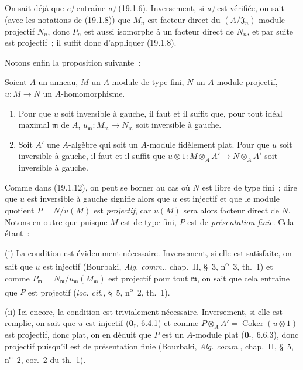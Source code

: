 On sait déjà que \emph{c)} entraîne \emph{a)} (19.1.6). Inversement, si \emph{a)} est vérifiée, on
sait (avec les notations de (19.1.8)) que $M_n$ est facteur direct du
$(A/\mathfrak J_n)$-module projectif $N_n$, donc $P_n$ est aussi isomorphe à
un facteur direct de $N_n$, et par suite est projectif~; il suffit donc
d'appliquer (19.1.8).

Notons enfin la proposition suivante~:

\begin{proposition}[19.1.14]
\label{0.19.1.14-fr}
Soient $A$ un anneau, $M$ un $A$-module de type fini, $N$ un $A$-module
projectif, $u:M\to N$ un $A$-homomorphisme.
\begin{enumerate}
  \item[\textup{(i)}] Pour que $u$ soit inversible à gauche, il faut et il suffit que,
  pour tout idéal maximal $\mathfrak m$ de $A$,
  $u_{\mathfrak m}:M_{\mathfrak m}\to N_{\mathfrak m}$ soit inversible à
  gauche.
  \item[\textup{(ii)}] Soit $A'$ une $A$-algèbre qui soit un $A$-module fidèlement
  plat. Pour que $u$ soit inversible à gauche, il faut et il suffit que
  $u\otimes1:M\otimes_AA'\to N\otimes_AA'$ soit inversible à gauche.
\end{enumerate}
\end{proposition}

Comme dans (19.1.12), on peut se borner au cas où $N$ est libre de type fini~;
dire que $u$ est inversible à gauche signifie alors que $u$ est injectif et
que le module quotient $P=N/u(M)$ est \emph{projectif}, car $u(M)$ sera alors
facteur direct de $N$. Notons en outre que puisque $M$ est de type fini, $P$
est de \emph{présentation finie}. Cela étant~:

(i) La condition est évidemment nécessaire. Inversement, si elle est
satisfaite, on sait que $u$ est injectif (Bourbaki, \emph{Alg. comm.},
chap.~II, §~3, n\textsuperscript{o}~3, th.~1) et comme
$P_{\mathfrak m}=N_{\mathfrak m}/u_{\mathfrak m}(M_{\mathfrak m})$ est
projectif pour tout $\mathfrak m$, on sait que cela entraîne que $P$ est
projectif (\emph{loc. cit.}, §~5, n\textsuperscript{o}~2, th.~1).

(ii) Ici encore, la condition est trivialement nécessaire. Inversement, si
elle est remplie, on sait que $u$ est injectif ($\mathbf{0}_{\mathrm I}$,
6.4.1) et comme $P\otimes_AA'=\operatorname{Coker}(u\otimes1)$ est projectif,
donc plat, on en déduit que $P$ est un $A$-module plat
($\mathbf{0}_{\mathrm I}$, 6.6.3), donc projectif puisqu'il est de présentation
finie (Bourbaki, \emph{Alg. comm.}, chap.~II, §~5,
n\textsuperscript{o}~2, cor.~2 du th.~1).

